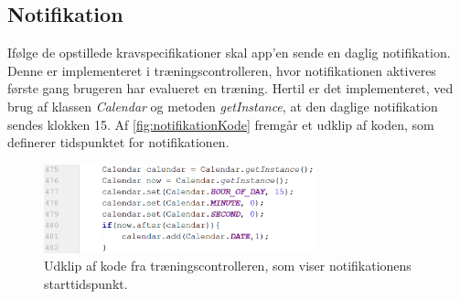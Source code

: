 \subsection*{Notifikation}
Ifølge de opstillede kravspecifikationer skal app'en sende en daglig notifikation. Denne er implementeret i træningscontrolleren, hvor notifikationen aktiveres første gang brugeren har evalueret en træning. Hertil er det implementeret, ved brug af klassen \textit{Calendar} og metoden \textit{getInstance}, at den daglige notifikation sendes klokken 15. Af \autoref{fig:notifikationKode} fremgår et udklip af koden, som definerer tidspunktet for notifikationen. 

\begin{figure} [H]
\centering
\includegraphics[width=0.7\textwidth]{figures/imple/notifikationKode}
\caption{Udklip af kode fra træningscontrolleren, som viser notifikationens starttidspunkt.}
\label{fig:notifikationKode}
\end{figure} 
